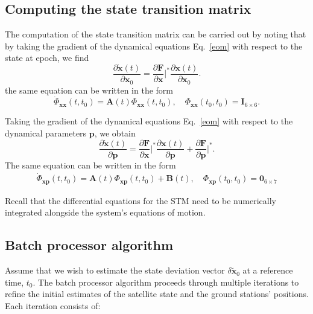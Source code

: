 \documentclass[pdflatex,sn-mathphys-num]{sn-jnl}%
\theoremstyle{thmstyleone}%
\theoremstyle{thmstyletwo}%
\theoremstyle{thmstylethree}%
\renewcommand{\vec}[1]{\boldsymbol{#1}}
\begin{document}
	
	
	\subsection{Computing the state transition matrix}
	The computation of the state transition matrix can be carried out by noting that by taking the gradient of the dynamical equations Eq.~\eqref{eom} with respect to the state at epoch, we find
	\begin{equation}
		\frac{\partial \dot{\vec{x}}(t)}{\partial \vec{x}_0} = \frac{\partial \vec{F}}{\partial \vec{x}} \Bigg|^* \frac{\partial \vec{x}(t)}{\partial \vec{x}_0}.
		 \label{eq:22.28}
	\end{equation}
	the same equation can be written in the form
	\begin{equation}
		\dot{\Phi}_{\vec{xx}}(t, t_0) = \vec{A}(t) \Phi_{\vec{xx}}(t, t_0), 
		\quad 
		\Phi_{\vec{xx}}(t_0, t_0) = \vec{I}_{6\times 6}.
		\label{eq:22.32}
	\end{equation}
	
	
	Taking the gradient of the dynamical equations Eq.~\eqref{eom} with respect to the dynamical parameters \( \vec{p} \), we obtain
	\begin{equation}
		\frac{\partial \dot{\vec{x}}(t)}{\partial \vec{p}} = \frac{\partial \vec{F}}{\partial \vec{x}} \Bigg|^* \frac{\partial \vec{x}(t)}{\partial \vec{p}} + \frac{\partial \vec{F}}{\partial \vec{p}} \Bigg|^*.
		 \label{eq:22.33}
	\end{equation}
	The same equation can be written in the form
	\begin{align}
		\dot{\Phi}_{\vec{xp}}(t, t_0) = \vec{A}(t) \Phi_{\vec{xp}}(t, t_0) + \vec{B}(t), \quad {\Phi}_{\vec{xp}}(t_0, t_0) = \vec{0}_{6\times 7} 
	\end{align}
	
	Recall that the differential equations for the STM  need to be  numerically integrated alongside the system's equations of motion.
	
	\subsection{Batch processor algorithm}
	
	Assume that we wish to estimate the state deviation vector $\delta\tilde{\vec{x}}_0$ at a reference time, $t_0$.
	The batch processor  algorithm proceeds through multiple iterations to refine the initial estimates of the satellite state and the ground stations' positions. Each iteration consists of:
	
\end{document}
